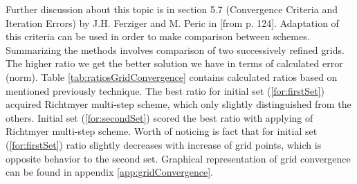 	Further discussion about this topic is in section 5.7 (Convergence Criteria and Iteration Errors) by J.H. Ferziger and M. Peric in \cite{bib:ferzinger}[from p. 124]. Adaptation of this criteria can be used in order to make comparison between schemes. Summarizing the methods involves comparison of two successively refined grids. The higher ratio we get the better solution we have in terms of calculated error (norm). Table \ref{tab:ratiosGridConvergence} contains calculated ratios based on mentioned previously technique. The best ratio for initial set (\ref{for:firstSet}) acquired Richtmyer multi-step scheme, which only slightly distinguished from the others. Initial set (\ref{for:secondSet}) scored the best ratio with applying of Richtmyer multi-step scheme. Worth of noticing is fact that for initial set (\ref{for:firstSet}) ratio slightly decreases with increase of grid points, which is opposite behavior to the second set. Graphical representation of grid convergence can be found in appendix \ref{app:gridConvergence}.
	

